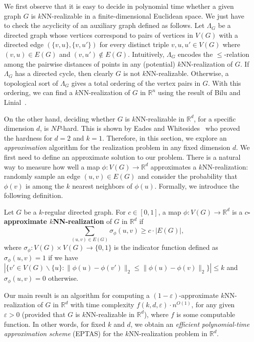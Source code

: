 We first observe that it is easy to decide in polynomial time whether a given graph $G$ is $k$NN-realizable in a finite-dimensional Euclidean space.
We just have to check the acyclicity of an auxiliary graph defined as follows. Let $\varLambda_G$ be a directed graph whose vertices correspond to pairs of vertices in $V(G)$ with a directed edge $(\{v,u\},\{v,u'\})$ for every distinct triple $v,u,u' \in V(G)$ where $(v,u) \in E(G)$ and $(v,u') \notin E(G)$.
Intuitively, $\varLambda_G$ encodes the $\leq$-relation among the pairwise distances of points in any (potential) $k$NN-realization of $G$.
If $\varLambda_G$ has a directed cycle, then clearly $G$ is not $k$NN-realizable.
Otherwise, a topological sort of $\varLambda_G$ gives a total ordering of the vertex pairs in $G$.
With this ordering, we can find a $k$NN-realization of $G$ in $\mathbb{R}^n$ using the result of Bilu and Linial~\cite{bilu2005}.

On the other hand, deciding whether $G$ is $k$NN-realizable in $\mathbb{R}^d$, for a specific dimension $d$, is $NP$-hard. This is shown by Eades and Whitesides~\cite{eades:1996} who proved the hardness for $d=2$ and $k=1$.
Therefore, in this section, we explore an \textit{approximation} algorithm for the realization problem in any fixed dimension $d$.
We first need to define an approximate solution to our problem.
There is a natural way to measure how well a map $\phi: V(G) \rightarrow \mathbb{R}^d$ approximates a $k$NN-realization: randomly sample an edge $(u,v) \in E(G)$ and consider the probability that $\phi(v)$ is among the $k$ nearest neighbors of $\phi(u)$.
Formally, we introduce the following definition.
\begin{definition} \label{def-apprxreal}
Let $G$ be a $k$-regular directed graph.
For $c \in [0,1]$, a map $\phi:V(G) \rightarrow \mathbb{R}^d$ is a \textbf{$c$-approximate $k$NN-realization} of $G$ in $\mathbb{R}^d$ if 
\begin{equation*}
    \sum_{(u,v) \in E(G)} \sigma_\phi(u,v) \geq c \cdot |E(G)|,
\end{equation*}
where $\sigma_\phi: V(G) \times V(G) \rightarrow \{0,1\}$ is the indicator function defined as $\sigma_\phi(u,v) = 1$ if we have $|\{v' \in V(G) \backslash \{u\}: \lVert \phi(u)-\phi(v') \rVert_2 \leq \lVert \phi(u)-\phi(v) \rVert_2 \}| \leq k$ and $\sigma_\phi(u,v) = 0$ otherwise.
\end{definition}

Our main result is an algorithm for computing a $(1-\varepsilon)$-approximate $k$NN-realization of $G$ in $\mathbb{R}^d$ with time complexity $f(k,d,\varepsilon) \cdot n^{O(1)}$, for any given $\varepsilon > 0$ (provided that $G$  is $k$NN-realizable in $\mathbb{R}^d$), where $f$ is some computable function.
In other words, for fixed $k$ and $d$, we obtain an \textit{efficient polynomial-time approximation scheme} (EPTAS) for the $k$NN-realization problem in $\mathbb{R}^d$.

